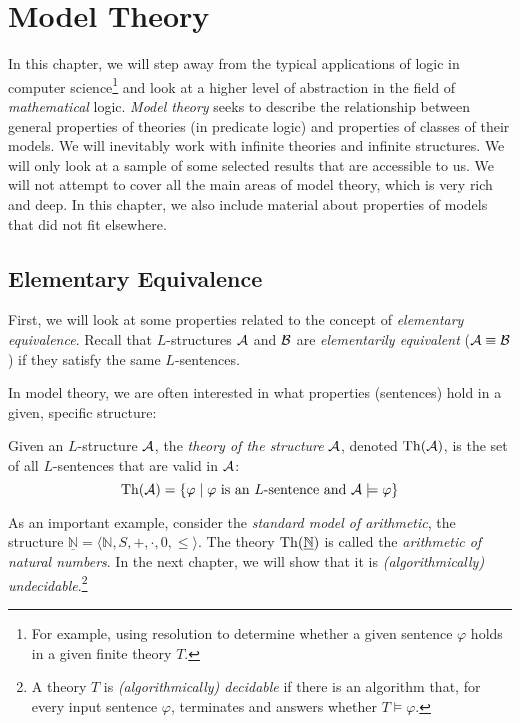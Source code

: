 \chapter{Model Theory}\label{chapter:model-theory}

In this chapter, we will step away from the typical applications of logic in computer science\footnote{For example, using resolution to determine whether a given sentence $\varphi$ holds in a given finite theory $T$.} and look at a higher level of abstraction in the field of \emph{mathematical} logic. \emph{Model theory} seeks to describe the relationship between general properties of theories (in predicate logic) and properties of classes of their models. We will inevitably work with infinite theories and infinite structures. We will only look at a sample of some selected results that are accessible to us. We will not attempt to cover all the main areas of model theory, which is very rich and deep. In this chapter, we also include material about properties of models that did not fit elsewhere.

\section{Elementary Equivalence}

First, we will look at some properties related to the concept of \emph{elementary equivalence}. Recall that $L$-structures $\mathcal{A}$ and $\mathcal{B}$ are \emph{elementarily equivalent} ($\mathcal{A}\equiv \mathcal{B}$) if they satisfy the same $L$-sentences.

In model theory, we are often interested in what properties (sentences) hold in a given, specific structure:

\begin{definition}
Given an $L$-structure $\mathcal{A}$, the \emph{theory of the structure} $\mathcal{A}$, denoted $\operatorname{Th}(\mathcal{A})$, is the set of all $L$-sentences that are valid in $\mathcal{A}$:
$$
\operatorname{Th}(\mathcal{A})=\{\varphi\mid\varphi \text{ is an $L$-sentence and } \mathcal{A}\models\varphi\}
$$
\end{definition}

\begin{example}
As an important example, consider the \emph{standard model of arithmetic}, the structure $\underline{\mathbb{N}}=\langle\mathbb{N},S,+,\cdot,0,\le\rangle$. The theory $\operatorname{Th}(\underline{\mathbb{N}})$ is called the \emph{arithmetic of natural numbers}. In the next chapter, we will show that it is \emph{(algorithmically) undecidable}.\footnote{A theory $T$ is \emph{(algorithmically) decidable} if there is an algorithm that, for every input sentence $\varphi$, terminates and answers whether $T\models\varphi$.}
\end{example}

